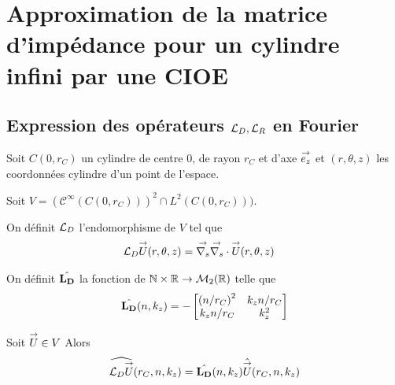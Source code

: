 \section{Approximation de la matrice d'impédance pour un cylindre infini par une CIOE}

  \subsection[Expression des opérateurs LD,LR en Fourier]{Expression des opérateurs \({\mathcal{L}_D},{\mathcal{L}_R}\) en Fourier}
    Soit \(C(0,r_C)\) un cylindre de centre 0, de rayon \(r_C\) et d'axe \({\overset{\rightarrow}{e_z}}\) et \((r,\theta,z)\) les coordonnées cylindre d'un point de l'espace.

    Soit \(V = \left(\mathcal{C}^\infty(C(0,r_C))\right)^2 \cap L^2(C(0,r_C)))\).

    \begin{defn}
      \label{eq:cylindre:fourier:LD}
      On définit \({\mathcal{L}_D}\) l'endomorphisme de \(V\) tel que
      \begin{align*}
        {\mathcal{L}_D} {\overset{\rightarrow}{U}}(r,\theta,z) & = {\overset{\rightarrow}{\nabla_s}}{} {\overset{\rightarrow}{\nabla_s}} \cdot{} {\overset{\rightarrow}{U}}(r,\theta,z)
      \end{align*}

      On définit \(\hat{\mathbf{L_D}}\) la fonction de \(\mathbb N\times\mathbb R \rightarrow \mathcal{M}_2(\mathbb R)\) telle que
      \begin{equation*}
        \hat{\mathbf{L_D}}(n,k_z) = -
        \begin{bmatrix}
          \left({n}\slash{r_C}\right)^2 & k_z{n}\slash{r_C}
          \\
          k_z{n}\slash{r_C} & k_z^2
        \end{bmatrix}
      \end{equation*}
    \end{defn}

    \begin{prop}
      Soit \({\overset{\rightarrow}{U}} \in V\)
      Alors
      \begin{equation*}
        \widehat{{\mathcal{L}_D} {\overset{\rightarrow}{U}}} (r_C,n,k_z) = \hat{\mathbf{L_D}}(n,k_z) \hat{{\overset{\rightarrow}{U}}}(r_C,n,k_z)
      \end{equation*}
    \end{prop}

